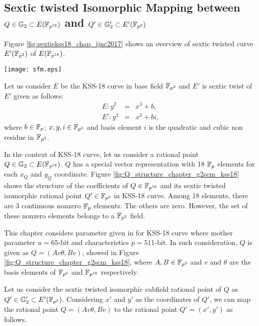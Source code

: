 \subsection{Sextic twisted Isomorphic Mapping between \texorpdfstring{$Q \in {\mathbb{G}}_{2} \subset E(\mathbb{F}_{p^{18}})$}{} and \texorpdfstring{$Q' \in {\mathbb{G}}_{2}' \subset E'(\mathbb{F}_{p^3})$}{}}
Figure \ref{fig:sextickss18_chap_ijnc2017} shows an overview of sextic twisted curve $E'(\mathbb{F}_{p^3})$ of $E(\mathbb{F}_{p^{18}})$.
\begin{figure*}
	\centering
	\texttt{[image: sfm.eps]}
	\caption{\textit{sextic twist} in KSS-18 curve.}
	\label{fig:sextickss18_chap_ijnc2017}
\end{figure*}

Let us consider $E$ be the KSS-18 curve in base field $\mathbb{F}_{p^3}$  and $E'$ is sextic twist of $E'$ given as follows: 
\begin{eqnarray}
E:y^2 & = &x^3+b,\\
E':y^2 & = & x^3+bi, \label{eq:KSS18_Twist_chap_ijnc2017}
\end{eqnarray}
where $b \in {\mathbb{F}}_{p}$; $x, y, i \in \mathbb{F}_{p^3}$ and basis element $i$ is the quadratic and cubic non residue in $\mathbb{F}_{p^3}$.

In the context of KSS-18 curve, let us consider a rational point $Q\in {\mathbb{G}}_{2} \subset E({\mathbb{F}}_{p^{18}})$.
$Q$ has a  special vector representation with 18 ${\mathbb{F}}_{p}$ elements for each $x_Q$ and $y_Q$ coordinate.
Figure \ref{fig:Q_structure_chapter_g2scm_kss18} shows the structure of the coefficients of $Q \in \mathbb{F}_{p^{18}}$ and its sextic twisted isomorphic rational point $Q' \in \mathbb{F}_{p^3}$ in KSS-18 curve.
Among 18 elements, there are 3 continuous nonzero ${\mathbb{F}}_{p}$ elements. The others are zero.
However, the set of these nonzero elements belongs to a $\mathbb{F}_{p^3}$ field. 

This chapter considers parameter given in  for KSS-18 curve where mother parameter $u=65$-bit and characteristics $p=511$-bit. In such consideration, $Q$ is given as $Q = (Av\theta, Bv)$,  showed in Figure \ref{fig:Q_structure_chapter_g2scm_kss18}, where $A, B \in \mathbb{F}_{p^3}$ and $v$ and $\theta$ are the basis elements of ${\mathbb{F}}_{p^{6}}$ and $\mathbb{F}_{p^{18}}$ respectively. 

Let us consider the sextic twisted isomorphic subfield rational point of $Q$ as $Q' \in {\mathbb{G}}_{2}' \subset E'({\mathbb{F}}_{p^{3}})$.
Considering $x'$ and $y'$ as the coordinates of $Q'$, we can map the rational point $Q = (Av\theta, Bv)$  to the rational point  $Q' = (x',y')$ as follows.

